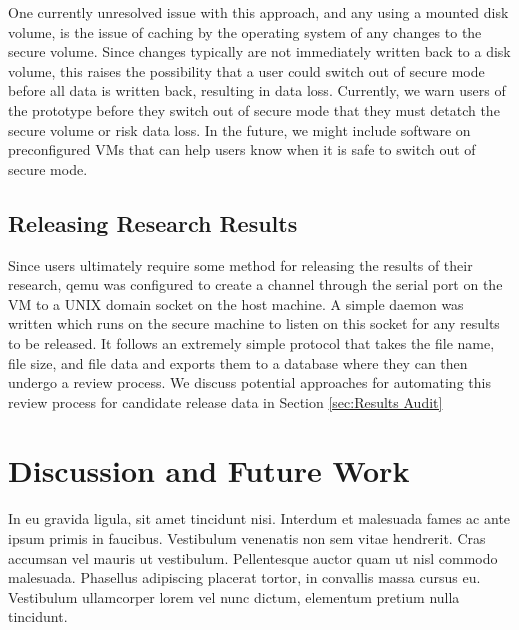 \documentclass{acm_proc_article-sp}
\begin{document}
One currently unresolved issue with this approach, and any using a mounted disk
volume, is the issue of caching by the operating system of any changes to the
secure volume.  Since changes typically are not immediately written back to a
disk volume, this raises the possibility that a user could switch out of secure
mode before all data is written back, resulting in data loss.  Currently, we
warn users of the prototype before they switch out of secure mode that they must
detatch the secure volume or risk data loss.  In the future, we might include
software on preconfigured VMs that can help users know when it is safe to switch
out of secure mode.

\subsection{Releasing Research Results}

Since users ultimately require some method for releasing the results of their
research, qemu was configured to create a channel through the serial port on the
VM to a UNIX domain socket on the host machine.  A simple daemon was written
which runs on the secure machine to listen on this socket for any results to be
released.  It follows an extremely simple protocol that takes the file name,
file size, and file data and exports them to a database where they can then
undergo a review process.  We discuss potential approaches for automating this
review process for candidate release data in Section \ref{sec:Results Audit}

\section{Discussion and Future Work}
\label{sec:Discussion}






In eu gravida ligula, sit amet tincidunt nisi. Interdum et malesuada fames ac
ante ipsum primis in faucibus.  Vestibulum venenatis non sem vitae hendrerit.
Cras accumsan vel mauris ut vestibulum. Pellentesque auctor quam ut nisl
commodo malesuada. Phasellus adipiscing placerat tortor, in convallis massa
cursus eu. Vestibulum ullamcorper lorem vel nunc dictum, elementum pretium
nulla tincidunt.
\end{document}
